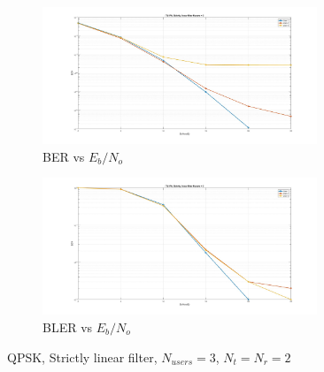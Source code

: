 \documentclass[12pt,a4paper,notitlepage,twoside,headsepline]{scrartcl}
\begin{document}
\begin{figure}
\centering
\begin{subfigure}{.5\textwidth}
  \centering
  \includegraphics[width=0.9\textwidth]{figures/sl_nu3_ber}
  \caption{BER vs $E_b/N_o$} 
  \label{fig:example}
\end{subfigure}%
\begin{subfigure}{.5\textwidth}
  \centering
  \includegraphics[width=0.9\textwidth]{figures/sl_nu3_bler}
  \caption{BLER vs $E_b/N_o$}
  \label{fig:example}
\end{subfigure}
\caption{QPSK, Strictly linear filter, $N_{users} = 3$, $N_t = N_r = 2$}
\label{fig:test}
\end{figure}
\end{document}
